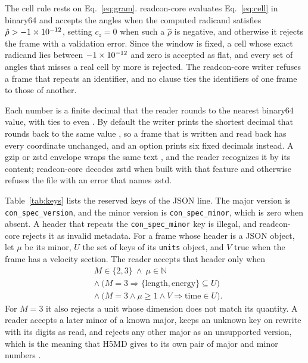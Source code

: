 \documentclass[preprint,12pt]{elsarticle}
\begin{document}
The cell rule rests on Eq.~\eqref{eq:gram}.
readcon-core evaluates Eq.~\eqref{eq:cell} in binary64 and accepts the angles when the computed radicand satisfies \(\hat\rho>-\num{1e-12}\), setting \(c_z=0\) when such a \(\hat\rho\) is negative, and otherwise it rejects the frame with a validation error.
Since the window is fixed, a cell whose exact radicand lies between \(-\num{1e-12}\) and zero is accepted as flat, and every set of angles that misses a real cell by more is rejected.
The readcon-core writer refuses a frame that repeats an identifier, and no clause ties the identifiers of one frame to those of another.

Each number is a finite decimal that the reader rounds to the nearest binary64 value, with ties to even \cite{ieeecomputersocietyIeeeStandardFloatingpoint2019,clingerHowReadFloating1990,lemireNumberParsingGigabytes2021}.
By default the writer prints the shortest decimal that rounds back to the same value \cite{steeleHowPrintFloatingpoint1990,loitschPrintingFloatingpointNumbers2010,andryscoPrintingFloatingpointNumbers2016,adamsRyFastFloattostring2018}, so a frame that is written and read back has every coordinate unchanged, and an option prints six fixed decimals instead.
A gzip or zstd envelope wraps the same text \cite{deutschGzipFileFormat1996,colletZstandardCompressionApplicationzstd2021}, and the reader recognizes it by its content; readcon-core decodes zstd when built with that feature and otherwise refuses the file with an error that names zstd.

Table~\ref{tab:keys} lists the reserved keys of the JSON line.
The major version is \texttt{con\_spec\_version}, and the minor version is \texttt{con\_spec\_minor}, which is zero when absent.
A header that repeats the \texttt{con\_spec\_minor} key is illegal, and readcon-core rejects it as invalid metadata.
For a frame whose header is a JSON object, let \(\mu\) be its minor, \(U\) the set of keys of its \texttt{units} object, and \(V\) true when the frame has a velocity section.
The reader accepts that header only when
\begin{equation}
\label{eq:version}
\begin{aligned}
&M\in\{2,3\}\ \wedge\ \mu\in\mathbb{N}\\
&\wedge\ \bigl(M=3\Rightarrow\{\mathrm{length},\mathrm{energy}\}\subseteq U\bigr)\\
&\wedge\ \bigl(M=3\wedge\mu\ge1\wedge V\Rightarrow \mathrm{time}\in U\bigr).
\end{aligned}
\end{equation}
For \(M=3\) it also rejects a unit whose dimension does not match its quantity.
A reader accepts a later minor of a known major, keeps an unknown key on rewrite with its digits as read, and rejects any other major as an unsupported version, which is the meaning that H5MD gives to its own pair of major and minor numbers \cite{buylH5mdStructuredEfficient2014}.
\end{document}
